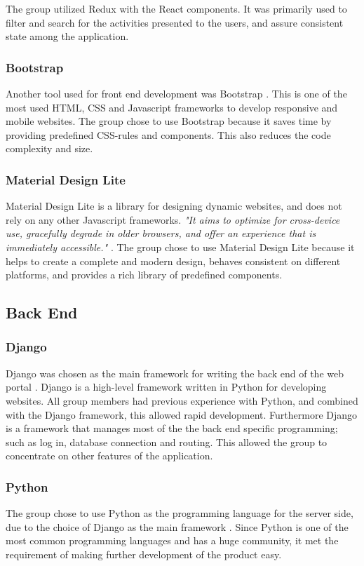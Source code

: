 The group utilized Redux with the React components. It was primarily used to filter and search for the activities presented to the users, and assure consistent state among the application.  

\subsubsection{Bootstrap}
Another tool used for front end development was Bootstrap \cite{Bootstrap}. This is one of the most used HTML, CSS and Javascript frameworks to develop responsive and mobile websites. The group chose to use Bootstrap because it saves time by providing predefined CSS-rules and components. This also reduces the code complexity and size. 

\subsubsection{Material Design Lite}
\label{mdl}
Material Design Lite \cite{Material_Design_Lite} is a library for designing dynamic websites, and does not rely on any other Javascript frameworks. \textit{"It aims to optimize for cross-device use, gracefully degrade in older browsers, and offer an experience that is immediately accessible."} \cite{Material_Design_Lite}. The group chose to use Material Design Lite because it helps to create a complete and modern design, behaves consistent on different platforms, and provides a rich library of predefined components.

\subsection{Back End}
\label{backEnd}

\subsubsection{Django}
\label{django}
Django was chosen as the main framework for writing the back end of the web portal \cite{django}. Django is a high-level framework written in Python for developing websites. All group members had previous experience with Python, and combined with the Django framework, this allowed rapid development. Furthermore Django is a framework that manages most of the the back end specific programming; such as log in, database connection and routing. This allowed the group to concentrate on other features of the application. 

\subsubsection{Python}
\label{python}
The group chose to use Python as the programming language for the server side, due to the choice of Django as the main framework \cite{python}. Since Python is one of the most common programming languages \cite{Programminglanguagespopularity} and has a huge community, it met the requirement of making further development of the product easy.

